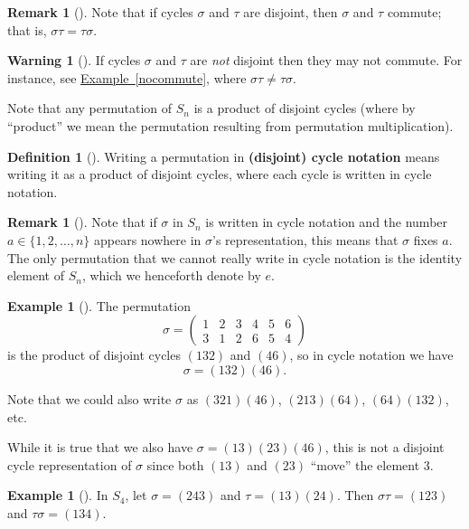 \documentclass[10pt,]{book}
\newcommand{\terminology}[1]{\textbf{#1}}
\theoremstyle{plain}
\theoremstyle{definition}
\newtheorem{definition}[theorem]{Definition}
\theoremstyle{definition}
\newtheorem{remark}[theorem]{Remark}
\newtheorem{warning}[theorem]{Warning}
\theoremstyle{definition}
\newtheorem{example}[theorem]{Example}
\theoremstyle{definition}
\numberwithin{equation}{section}
\newcommand{\amp}{&}
\begin{document}
\begin{remark}[]\label{remark-28}
Note that if cycles \(\sigma\) and \(\tau\) are disjoint, then \(\sigma\) and \(\tau\) commute; that is, \(\sigma \tau=\tau \sigma\).%
\end{remark}
\begin{warning}[]\label{warning-17}
If cycles \(\sigma\) and \(\tau\) are \emph{not} disjoint then they may not commute. For instance, see \hyperref[nocommute]{Example~\ref{nocommute}}, where \(\sigma\tau \neq \tau \sigma\).%
\end{warning}
Note that any permutation of \(S_n\) is a product of disjoint cycles (where by ``product'' we mean the permutation resulting from permutation multiplication).%
\begin{definition}[{}]\label{definition-50}
Writing a permutation in \terminology{(disjoint) cycle notation} means writing it as a product of disjoint cycles, where each cycle is written in cycle notation.%
\end{definition}
\begin{remark}[]\label{remark-29}
Note that if \(\sigma\) in \(S_n\) is written in cycle notation and the number \(a\in \{1,2,\ldots, n\}\) appears nowhere in \(\sigma\)'s representation, this means that \(\sigma\) fixes \(a\). The only permutation that we cannot really write in cycle notation is the identity element of \(S_n\), which we henceforth denote by \(e\).%
\end{remark}
\begin{example}[]\label{example-54}
The permutation%
\begin{equation*}
\sigma =\begin{pmatrix}1\amp 2\amp 3\amp 4\amp 5\amp 6\\ 3\amp 1\amp 2\amp 6\amp 5\amp 4
\end{pmatrix}
\end{equation*}
is the product of disjoint cycles \((132)\) and \((46)\), so in cycle notation we have%
\begin{equation*}
\sigma=(132)(46).
\end{equation*}
%
\par
Note that we could also write \(\sigma\) as \((321)(46)\), \((213)(64)\), \((64)(132)\), etc.%
\par
While it is true that we also have \(\sigma=(13)(23)(46)\), this is not a disjoint cycle representation of \(\sigma\) since both \((13)\) and \((23)\) ``move'' the element \(3\).%
\end{example}
\begin{example}[]\label{example-55}
In \(S_4\), let \(\sigma=(243)\) and \(\tau=(13)(24)\). Then \(\sigma \tau=(123)\) and \(\tau \sigma = (134).\)%
\end{example}
\end{document}

